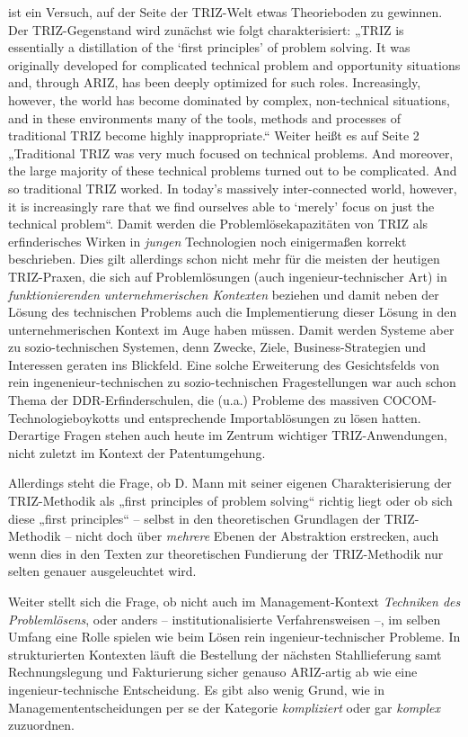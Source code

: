 \documentclass[11pt,a4paper]{article}
\begin{document}
\cite{Mann2019} ist ein Versuch, auf der Seite der TRIZ-Welt etwas
Theorieboden zu gewinnen. Der TRIZ-Gegenstand wird zunächst wie folgt
charakterisiert: „TRIZ is essentially a distillation of the `first principles'
of problem solving. It was originally developed for complicated technical
problem and opportunity situations and, through ARIZ, has been deeply
optimized for such roles. Increasingly, however, the world has become
dominated by complex, non-technical situations, and in these environments many
of the tools, methods and processes of traditional TRIZ become highly
inappropriate.“ Weiter heißt es auf Seite 2 „Traditional TRIZ was very much
focused on technical problems.  And moreover, the large majority of these
technical problems turned out to be complicated. And so traditional TRIZ
worked. In today's massively inter-connected world, however, it is
increasingly rare that we find ourselves able to `merely' focus on just the
technical problem“. Damit werden die Problemlösekapazitäten von TRIZ als
erfinderisches Wirken in \emph{jungen} Technologien noch einigermaßen korrekt
beschrieben. Dies gilt allerdings schon nicht mehr für die meisten der
heutigen TRIZ-Praxen, die sich auf Problemlösungen (auch ingenieur-technischer
Art) in \emph{funktionierenden unternehmerischen Kontexten} beziehen und damit
neben der Lösung des technischen Problems auch die Implementierung dieser
Lösung in den unternehmerischen Kontext im Auge haben müssen.  Damit werden
Systeme aber zu sozio-technischen Systemen, denn Zwecke, Ziele,
Business-Strategien und Interessen geraten ins Blickfeld. Eine solche
Erweiterung des Gesichtsfelds von rein ingenenieur-technischen zu
sozio-technischen Fragestellungen war auch schon Thema der
DDR-Erfinderschulen, die (u.a.) Probleme des massiven
COCOM-Technologieboykotts und entsprechende Importablösungen zu lösen
hatten. Derartige Fragen stehen auch heute im Zentrum wichtiger
TRIZ-Anwendungen, nicht zuletzt im Kontext der Patentumgehung.

Allerdings steht die Frage, ob D. Mann mit seiner eigenen Charakterisierung
der TRIZ-Methodik als „first principles of problem solving“ richtig liegt oder
ob sich diese „first principles“ -- selbst in den theoretischen Grundlagen der
TRIZ-Methodik -- nicht doch über \emph{mehrere} Ebenen der Abstraktion
erstrecken, auch wenn dies in den Texten zur theoretischen Fundierung der
TRIZ-Methodik nur selten genauer ausgeleuchtet wird.

Weiter stellt sich die Frage, ob nicht auch im Management-Kontext
\emph{Techniken des Problemlösens}, oder anders -- institutionalisierte
Verfahrensweisen --, im selben Umfang eine Rolle spielen wie beim Lösen rein
ingenieur-technischer Probleme. In strukturierten Kontexten läuft die
Bestellung der nächsten Stahllieferung samt Rechnungslegung und Fakturierung
sicher genauso ARIZ-artig ab wie eine ingenieur-technische Entscheidung. Es
gibt also wenig Grund, wie in \cite{Mann2019} Managemententscheidungen per se
der Kategorie \emph{kompliziert} oder gar \emph{komplex} zuzuordnen.
\end{document}

